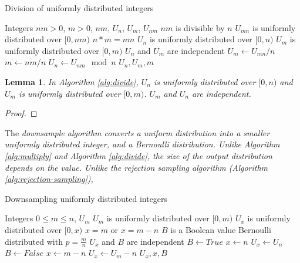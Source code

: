 \documentclass[12pt]{article}
\newtheorem{lemma}{Lemma}
\begin{document}
\begin{algorithm}
\caption{Division of uniformly distributed integers}
\label{alg:divide}
\begin{algorithmic}[1]
    \Require Integers $nm>0$, $m>0$, $nm$, $U_n$, $U_m$, $U_{nm}$
    \Require $nm$ is divisible by $n$
    \Require $U_{mn}$ is uniformly distributed over $[0,nm)$
\Ensure $n * m = nm$
\Ensure $U_{n}$ is uniformly distributed over $[0,n)$
\Ensure $U_{m}$ is uniformly distributed over $[0,m)$
\Ensure $U_n$ and $U_m$ are independent
  \State $U_m \gets U_{mn} / n$
  \State $m \gets nm / n$
  \State $U_{n} \gets U_{nm} \mod n$
  \State \Return $U_n, U_m, m$
\EndProcedure
\end{algorithmic}
\end{algorithm}

\begin{lemma}
In Algorithm \ref{alg:divide}, $U_n$ is uniformly distributed over $[0,n)$ and $U_m$ is uniformly distributed over $[0,m)$. $U_m$ and $U_n$ are independent.
\end{lemma}

\begin{proof}
\end{proof}

The \em downsample \em algorithm converts a uniform distribution into a smaller uniformly distributed integer, and a Bernoulli distribution. Unlike Algorithm \ref{alg:multiply} and Algorithm \ref{alg:divide}, the size of the output distribution depends on the value. Unlike the \em rejection sampling \em algorithm (Algorithm \ref{alg:rejection-sampling}), 

\begin{algorithm}
\caption{Downsampling uniformly distributed integers}
\label{alg:downsample}
\begin{algorithmic}[1]
    \Require Integers $0 \le m \le n$, $U_{m}$
    \Require $U_{m}$ is uniformly distributed over $[0,m)$
\Ensure $U_{x}$ is uniformly distributed over $[0,x)$
\Ensure $x = m$ or $x=m-n$
\Ensure $B$ is a Boolean value Bernoulli distributed with $p=\frac{m}{n}$
\Ensure $U_x$ and $B$ are independent
    \State $B \gets True$  
    \State $x \gets n$
    \State $U_x \gets U_n$
  \Else
    \State $B \gets False$  
    \State $x \gets m-n$
    \State $U_x \gets U_m-n$
  \EndIf
  \State \Return $U_x, x, B$
\EndProcedure
\end{algorithmic}
\end{algorithm}
\end{document}
